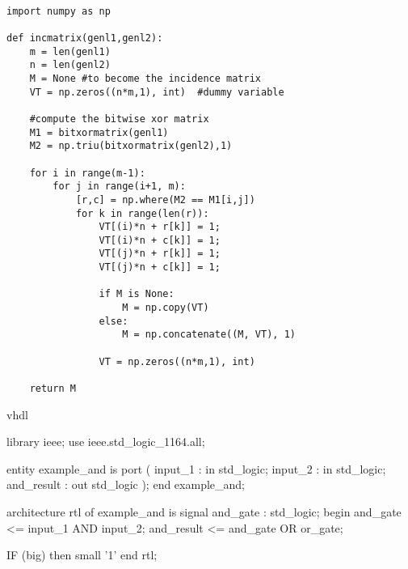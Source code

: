 \begin{verbatim}

import numpy as np
    
def incmatrix(genl1,genl2):
    m = len(genl1)
    n = len(genl2)
    M = None #to become the incidence matrix
    VT = np.zeros((n*m,1), int)  #dummy variable
    
    #compute the bitwise xor matrix
    M1 = bitxormatrix(genl1)
    M2 = np.triu(bitxormatrix(genl2),1) 

    for i in range(m-1):
        for j in range(i+1, m):
            [r,c] = np.where(M2 == M1[i,j])
            for k in range(len(r)):
                VT[(i)*n + r[k]] = 1;
                VT[(i)*n + c[k]] = 1;
                VT[(j)*n + r[k]] = 1;
                VT[(j)*n + c[k]] = 1;
                
                if M is None:
                    M = np.copy(VT)
                else:
                    M = np.concatenate((M, VT), 1)
                
                VT = np.zeros((n*m,1), int)
    
    return M
\end{verbatim}

\begin{code}{vhdl}

library ieee;
use ieee.std_logic_1164.all;
 
entity example_and is
  port (
    input_1    : in  std_logic;
    input_2    : in  std_logic;
    and_result : out std_logic
    );
end example_and;
 
architecture rtl of example_and is
  signal and_gate : std_logic;
begin
  and_gate   <= input_1 AND input_2;
  and_result <= and_gate OR or_gate;
  
  IF (big) then small '1'
end rtl;

\end{code}               

